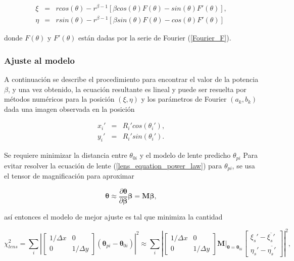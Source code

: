 \begin{eqnarray}
\label{lens_equation_power_law}
\xi & = & r cos(\theta) - r^{\beta-1}\left[ \beta cos(\theta)F(\theta) - sin(\theta) F'(\theta)  \right] , \\
\eta & = &  r sin(\theta) - r^{\beta-1}\left[ \beta sin(\theta)F(\theta) - cos(\theta) F'(\theta)  \right]
\end{eqnarray}

donde $F(\theta)$ y $F'(\theta)$ están dadas por la serie de Fourier (\ref{Fourier_F}).\\

\subsubsection{Ajuste al modelo}

A continuación se describe el procedimiento para encontrar el valor de la potencia $\beta$, y una vez obtenido, la ecuación resultante es lineal y puede ser resuelta por métodos numéricos para la posición $(\xi, \eta)$ y los parámetros de Fourier $(a_k, b_k)$ dada una imagen observada en la posición

\begin{eqnarray}
x_i' &=& R_i' cos (\theta_i'),\\
y_i' &=& R_i' sin (\theta_i').
\end{eqnarray}
 
Se requiere minimizar la distancia entre \textbf{$\theta_{0i}$} y el modelo de lente predicho \textbf{$\theta_{pi}$} Para evitar resolver la ecuación de lente (\ref{lens_equation_power_law}) para  \textbf{$\theta_{pi}$}, se usa el tensor de magnificación para aproximar 

 

$$\bm{\theta} \approx \frac{\partial \bm{\theta}}{\partial \bm{\beta} } \bm{\beta} =  \bm{M} \bm{\beta},  $$

así entonces el modelo de mejor ajuste es tal que minimiza \cite{TR16} la cantidad

\[
\chi_{lens}^2 = \sum_{i} \left |
\begin{bmatrix}
    1/\Delta x & 0 \\
    0 & 1/\Delta y
\end{bmatrix}
\left ( \bm{\theta}_{pi} - \bm{\theta}_{0i} \right ) \right |^2 \approx \sum_{i} \left |
\begin{bmatrix}
    1/\Delta x & 0 \\
    0 & 1/\Delta y
\end{bmatrix}
 \bm{M}|_{\bm{\theta} = \bm{\theta}_{0i}} 
\begin{bmatrix}
    \xi_s' - \overline{\xi_s'} \\
    \eta_s' - \overline{\eta_s'}
\end{bmatrix}
 \right |^2 ,
\]

